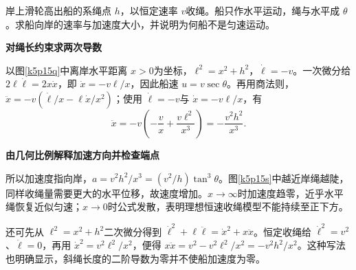 \begin{question}\begin{example}[恒速收绳时小船的加速度]\label{k5p15}
岸上滑轮高出船的系绳点 $h$，以恒定速率 $v$收绳。船只作水平运动，绳与水平成 $\theta$。求船向岸的速率与加速度大小，并说明为何船不是匀速运动。\end{example}
\end{question}
\begin{solution}\textbf{对绳长约束求两次导数}\par\nobreak
以图\ref{k5p15q}中离岸水平距离 $x>0$为坐标，$\ell^2=x^2+h^2$，$\dot\ell=-v$。一次微分给 $2\ell\dot\ell=2x\dot x$，即 $\dot x=-v\ell/x$，因此船速 $u=v\sec\theta$。再用商法则，$\ddot x=-v(\dot\ell/x-\ell\dot x/x^2)$；使用 $\dot\ell=-v$与 $\dot x=-v\ell/x$，有
\[\ddot x=-v\left(-\frac vx+\frac{v\ell^2}{x^3}\right)=-\frac{v^2h^2}{x^3}.\]



\par\medskip{}\noindent\textbf{由几何比例解释加速方向并检查端点}\par\nobreak
所以加速度指向岸，$\boxed{a=v^2h^2/x^3=(v^2/h)\tan^3\theta}$。图\ref{k5p15s}中越近岸绳越陡，同样收绳量需要更大的水平位移，故速度增加。$x\to\infty$时加速度趋零，近乎水平绳恢复近似匀速；$x\to0$时公式发散，表明理想恒速收绳模型不能持续至正下方。

还可先从 $\ell^2=x^2+h^2$二次微分得到 $\dot\ell^2+\ell\ddot\ell=\dot x^2+x\ddot x$。恒定收绳给 $\dot\ell^2=v^2$、$\ddot\ell=0$，再用 $\dot x^2=v^2\ell^2/x^2$，便得 $x\ddot x=v^2-v^2\ell^2/x^2=-v^2h^2/x^2$。这种写法也明确显示，斜绳长度的二阶导数为零并不使船加速度为零。\end{solution}

